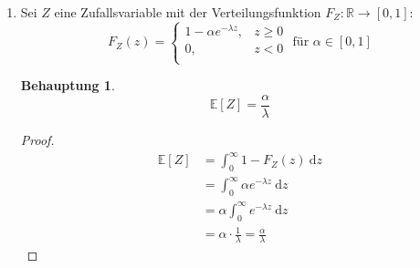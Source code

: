 \documentclass[a4paper]{scrartcl}
\newtheorem*{behaupt}{Behauptung}
\newcommand{\dif}{\ \mathrm{d}}
\newcommand{\e}{\mathbb{E}}
\def \blattnr {4}
\begin{document}
\begin{enumerate}[label=\bfseries \blattnr.\arabic*]
\begin{enumerate}
\begin{proof}
\begin{equation*}
\begin{split}
                            &= \int_0^\infty 1 - (1 - e^{-\lambda y}) \dif y \\
                            &= \int_0^\infty e^{-\lambda y} \dif y \\
                            &= \left[ -\frac{1}{\lambda}e^{-\lambda y}
                                 \right]_0^\infty \\
                            &= \lim_{x \to \infty} \left(
                                 -\frac{1}{\lambda}e^{-\lambda \cdot x} \right) 
                                 -\left( -\frac{1}{\lambda}e^{-\lambda \cdot 0}
                                 \right) \\
                            &= 0 - \left( -\frac{1}{\lambda} \right)
                             = \frac{1}{\lambda}
                        \end{split}
                    \end{equation*}
                \end{proof}

            \item
                Sei $Z$ eine Zufallsvariable mit der Verteilungsfunktion
                $F_Z \colon \mathbb{R} \to [0,1]$:
                \begin{equation*}
                    F_Z(z) =
                    \begin{cases}
                        1 - \alpha e^{-\lambda z} , & z \geq 0 \\
                        0 , & z < 0 \\
                    \end{cases}
                    \text{ für }
                    \alpha \in [0,1]
                \end{equation*}
                \begin{behaupt}
                    \begin{equation*}
                        \e[Z] = \frac{\alpha}{\lambda}
                    \end{equation*}
                \end{behaupt}
                \begin{proof}
                    \begin{equation*}
                        \begin{split}
                            \e[Z]
                            &= \int_0^\infty 1 - F_Z(z) \dif z \\
                            &= \int_0^\infty \alpha e^{-\lambda z} \dif z \\
                            &= \alpha \int_0^\infty e^{-\lambda z} \dif z \\
                            &= \alpha \cdot \frac{1}{\lambda}
                             = \frac{\alpha}{\lambda}
                        \end{split}
                    \end{equation*}
                \end{proof}


\end{enumerate}
\end{enumerate}
\end{document}
